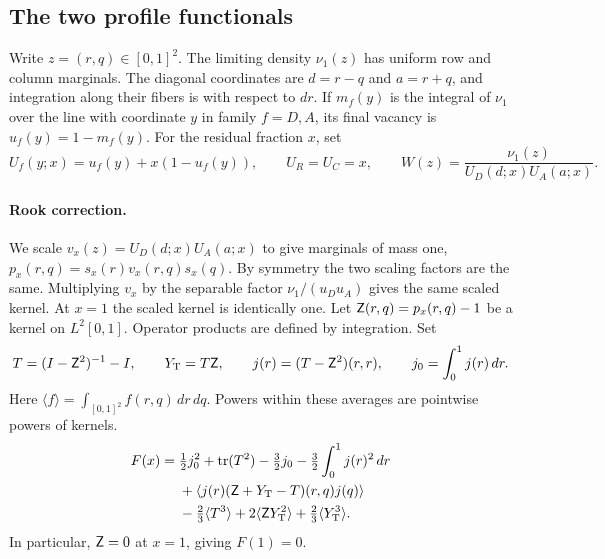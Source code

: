 \subsection{The two profile functionals}\label{sec:profile-data}
Write \(z=(r,q)\in[0,1]^2\). The limiting density \(\nu_1(z)\) has uniform row and column
marginals. The diagonal coordinates are \(d=r-q\) and \(a=r+q\), and integration along their
fibers is with respect to \(dr\). If \(m_f(y)\) is the integral of \(\nu_1\) over the line with
coordinate \(y\) in family \(f=D,A\), its final vacancy is \(u_f(y)=1-m_f(y)\). For the residual
fraction \(x\), set
\[
 U_f(y;x)=u_f(y)+x(1-u_f(y)),\qquad U_R=U_C=x,\qquad
 W(z)=\frac{\nu_1(z)}{U_D(d;x)U_A(a;x)} .
\]
\paragraph{Rook correction.}
We scale \(v_x(z)=U_D(d;x)U_A(a;x)\) to give marginals of mass one,
\(p_x(r,q)=s_x(r)v_x(r,q)s_x(q)\). By symmetry the two scaling factors are the same. Multiplying
\(v_x\) by the separable factor \(\nu_1/(u_Du_A)\) gives the same scaled kernel. At \(x=1\) the
scaled kernel is identically one. Let \(\mathsf Z(r,q)=p_x(r,q)-1\) be a kernel on \(L^2[0,1]\).
Operator products are defined by integration. Set
\[
 T=(I-\mathsf Z^2)^{-1}-I,\qquad Y_{\rm T}=T\mathsf Z,\qquad
 j(r)=(T-\mathsf Z^2)(r,r),\qquad j_0=\int_0^1j(r)\,dr .
\]
Here \(\langle f\rangle=\int_{[0,1]^2} f(r,q)\,dr\,dq\). Powers within these averages are
pointwise powers of kernels.
\begin{align}
 F(x)={}&\tfrac12 j_0^2+\operatorname{tr}(T^2)-\tfrac32j_0-\tfrac32\int_0^1 j(r)^2\,dr\notag\\
 &+\langle j(r)(\mathsf Z+Y_{\rm T}-T)(r,q)j(q)\rangle\notag\\
 &-\tfrac23\langle T^3\rangle+2\langle \mathsf Z Y_{\rm T}^2\rangle+\tfrac23\langle Y_{\rm T}^3\rangle
.\label{eq:F-def}
\end{align}
In particular, \(\mathsf Z=0\) at \(x=1\), giving \(F(1)=0\).
